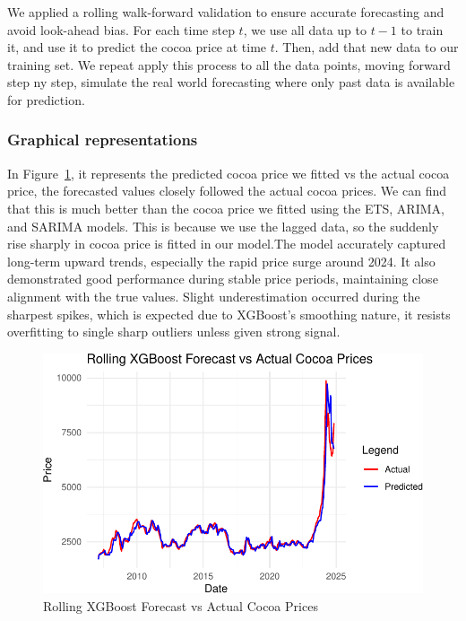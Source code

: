 \documentclass[
  letterpaper,
  DIV=11,
  numbers=noendperiod]{scrartcl}
\begin{document}
We applied a rolling walk-forward validation to ensure accurate
forecasting and avoid look-ahead bias. For each time step \(t\), we use
all data up to \(t-1\) to train it, and use it to predict the cocoa
price at time \(t\). Then, add that new data to our training set. We
repeat apply this process to all the data points, moving forward step ny
step, simulate the real world forecasting where only past data is
available for prediction.

\hypertarget{graphical-representations}{%
\subsubsection{Graphical
representations}\label{graphical-representations}}

In Figure~\ref{fig-xgboost-4}, it represents the predicted cocoa price
we fitted vs the actual cocoa price, the forecasted values closely
followed the actual cocoa prices. We can find that this is much better
than the cocoa price we fitted using the ETS, ARIMA, and SARIMA models.
This is because we use the lagged data, so the suddenly rise sharply in
cocoa price is fitted in our model.The model accurately captured
long-term upward trends, especially the rapid price surge around 2024.
It also demonstrated good performance during stable price periods,
maintaining close alignment with the true values. Slight underestimation
occurred during the sharpest spikes, which is expected due to XGBoost's
smoothing nature, it resists overfitting to single sharp outliers unless
given strong signal.

\begin{figure}

{\centering \includegraphics{STA457_Project_files/figure-pdf/fig-xgboost-4-1.pdf}

}

\caption{\label{fig-xgboost-4}Rolling XGBoost Forecast vs Actual Cocoa
Prices}

\end{figure}
\end{document}
